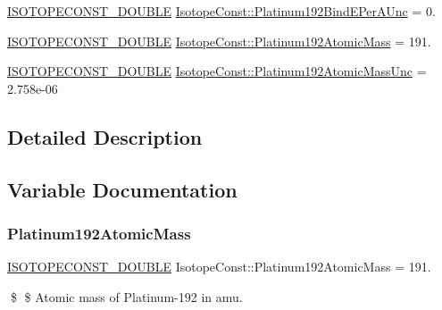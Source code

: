 \begin{DoxyCompactItemize}
\mbox{\hyperlink{group___isotope_const-_macros_ga8f45a7272ce02c0b4c65c44636ed719a}{I\+S\+O\+T\+O\+P\+E\+C\+O\+N\+S\+T\+\_\+\+D\+O\+U\+B\+LE}} \mbox{\hyperlink{group___isotope_const-_platinum-_pt192_ga332bc35b1b4feddd9b02766975bf294d}{Isotope\+Const\+::\+Platinum192\+Bind\+E\+Per\+A\+Unc}} = 0.
\item 
\mbox{\hyperlink{group___isotope_const-_macros_ga8f45a7272ce02c0b4c65c44636ed719a}{I\+S\+O\+T\+O\+P\+E\+C\+O\+N\+S\+T\+\_\+\+D\+O\+U\+B\+LE}} \mbox{\hyperlink{group___isotope_const-_platinum-_pt192_ga7e5c7a430239d3ec097cb932bddff78c}{Isotope\+Const\+::\+Platinum192\+Atomic\+Mass}} = 191.
\item 
\mbox{\hyperlink{group___isotope_const-_macros_ga8f45a7272ce02c0b4c65c44636ed719a}{I\+S\+O\+T\+O\+P\+E\+C\+O\+N\+S\+T\+\_\+\+D\+O\+U\+B\+LE}} \mbox{\hyperlink{group___isotope_const-_platinum-_pt192_gade487f77867d108d4918591e2f3c2d8a}{Isotope\+Const\+::\+Platinum192\+Atomic\+Mass\+Unc}} = 2.\+758e-\/06
\end{DoxyCompactItemize}


\subsection{Detailed Description}


\subsection{Variable Documentation}
\mbox{\label{group___isotope_const-_platinum-_pt192_ga7e5c7a430239d3ec097cb932bddff78c}} 
\subsubsection{\texorpdfstring{Platinum192\+Atomic\+Mass}{Platinum192AtomicMass}}
{\footnotesize\ttfamily \mbox{\hyperlink{group___isotope_const-_macros_ga8f45a7272ce02c0b4c65c44636ed719a}{I\+S\+O\+T\+O\+P\+E\+C\+O\+N\+S\+T\+\_\+\+D\+O\+U\+B\+LE}} Isotope\+Const\+::\+Platinum192\+Atomic\+Mass = 191.}

\$ \$ Atomic mass of Platinum-\/192 in amu. \mbox{\label{group___isotope_const-_platinum-_pt192_gade487f77867d108d4918591e2f3c2d8a}} 
